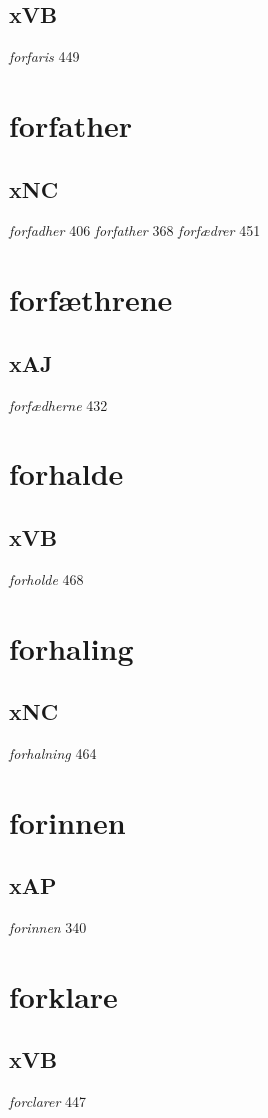 \documentclass[a4paper,twocolumn]{article}
\begin{document}
\subsection{xVB}
\label{sec:org456a785}
\emph{forfaris} 449 
\section{forfather}
\label{sec:orgd2746b1}
\subsection{xNC}
\label{sec:org4be705e}
\emph{forfadher} 406 \emph{forfather} 368 \emph{forfædrer} 451 
\section{forfæthrene}
\label{sec:org7a516b4}
\subsection{xAJ}
\label{sec:org5135724}
\emph{forfædherne} 432 
\section{forhalde}
\label{sec:orgff77f02}
\subsection{xVB}
\label{sec:org68dab01}
\emph{forholde} 468 
\section{forhaling}
\label{sec:org9f0d211}
\subsection{xNC}
\label{sec:orgf61039a}
\emph{forhalning} 464 
\section{forinnen}
\label{sec:org93ef7f6}
\subsection{xAP}
\label{sec:org758c929}
\emph{forinnen} 340 
\section{forklare}
\label{sec:org268f6c0}
\subsection{xVB}
\label{sec:org30d6bf8}
\emph{forclarer} 447 
\end{document}
